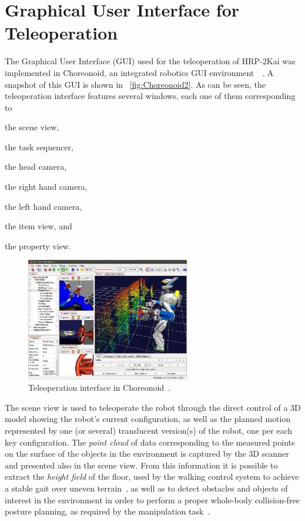 \section{Graphical User Interface for Teleoperation}
	\label{sec:teleoperation_gui}
	
	The Graphical User Interface (GUI) used for the teleoperation of HRP-2Kai was implemented
	in Choreonoid, an integrated robotics GUI environment~\cite{Choreonoid}~\cite{Nakaoka_Choreonoid}.
	A snapshot of this GUI is shown in \figurename~\ref{fig:Choreonoid2}.
	As can be seen, the teleoperation interface features several windows, each one of them
	corresponding to
	\begin{inparaenum}[(1)]
		\item the scene view,
		\item the task sequencer,
		\item the head camera,
		\item the right hand camera,
		\item the left hand camera,
		\item the item view, and
		\item the property view.
	\end{inparaenum}
		
	\begin{figure}[t]
		\centering
		\includegraphics[height = 5.35cm]{img/Choreonoid3}
		\caption{Teleoperation interface in Choreonoid~\cite{Nakaoka_Humanoids}.}
		\label{fig:Choreonoid3}
	\end{figure}
	
	The scene view is used to teleoperate the robot through the direct control of a 3D model
	showing the robot's current configuration, as well as the planned motion represented by
	one (or several) translucent version(s) of the robot, one per each key configuration.
	The \emph{point cloud} of data corresponding to the measured points on the surface of the
	objects in the environment is captured by the 3D scanner and presented also in the scene view.
	From this information it is possible to extract the \emph{height field} of the floor,
	used by the walking control system to achieve a stable gait over uneven terrain~\cite{Morisawa},
	as well as to detect obstacles and objects of interest in the environment in order to perform
	a proper whole-body collision-free posture planning, as required by the manipulation
	task~\cite{Kanoun}.
	
